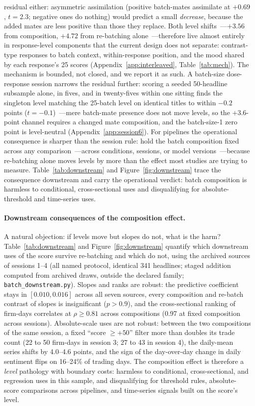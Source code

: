 residual either: asymmetric assimilation (positive batch-mates assimilate at $+0.69$, $t=2.3$; negative ones do nothing) would predict a small \emph{decrease}, because the added mates are less positive than those they replace. Both level shifts~---$+3.56$ from composition, $+4.72$ from re-batching alone~---therefore live almost entirely in response-level components that the current design does not separate: contrast-type responses to batch context, within-response position, and the mood shared by each response's 25 scores (Appendix~\ref{app:interleaved}, Table~\ref{tab:mech}). The mechanism is bounded, not closed, and we report it as such. A batch-size dose-response session narrows the residual further: scoring a seeded 50-headline subsample alone, in fives, and in twenty-fives within one sitting finds the singleton level matching the 25-batch level on identical titles to within $-0.2$ points ($t=-0.1$)~---mere batch-mate presence does not move levels, so the $+3.6$-point channel requires a changed mate composition, and the batch-size-1 zero point is level-neutral (Appendix~\ref{app:session6}). For pipelines the operational consequence is sharper than the session rule: hold the batch composition fixed across any comparison~---across conditions, sessions, or model versions~---because re-batching alone moves levels by more than the effect most studies are trying to measure. Table~\ref{tab:downstream} and Figure~\ref{fig:downstream} trace the consequence downstream and carry the operational verdict: batch composition is harmless to conditional, cross-sectional uses and disqualifying for absolute-threshold and time-series uses.

\paragraph{Downstream consequences of the composition effect.} A natural objection: if levels move but slopes do not, what is the harm? Table~\ref{tab:downstream} and Figure~\ref{fig:downstream} quantify which downstream uses of the score survive re-batching and which do not, using the archived sources of sessions 1--4 (all named protocol, identical 341 headlines; staged addition computed from archived draws, outside the declared family; \texttt{batch\_downstream.py}). Slopes and ranks are robust: the predictive coefficient stays in $[0.010, 0.016]$ across all seven sources, every composition and re-batch contrast of slopes is insignificant ($p>0.9$), and the cross-sectional ranking of firm-days correlates at $\rho\geq 0.81$ across compositions (0.97 at fixed composition across sessions). Absolute-scale uses are not robust: between the two compositions of the same session, a fixed ``score $\geq +50$'' filter more than doubles its trade count (22 to 50 firm-days in session 3; 27 to 43 in session 4), the daily-mean series shifts by 4.0--4.6 points, and the sign of the day-over-day change in daily sentiment flips on 16--24\% of trading days. The composition effect is therefore a \emph{level} pathology with boundary costs: harmless to conditional, cross-sectional, and regression uses in this sample, and disqualifying for threshold rules, absolute-score comparisons across pipelines, and time-series signals built on the score's level.

